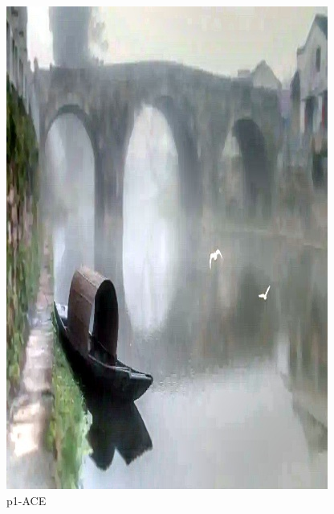 \documentclass[12pt]{article}
\begin{document}
\begin{figure}[!h]
\begin{minipage}[t]{0.24\linewidth}
        \includegraphics[width=0.9\linewidth]{sample_pictures/after_p1_ACE.jpg}
        \caption*{p1-ACE}
    \end{minipage}\begin{minipage}[t]{0.24\linewidth}
        \centering

\end{minipage}
\end{figure}
\end{document}
